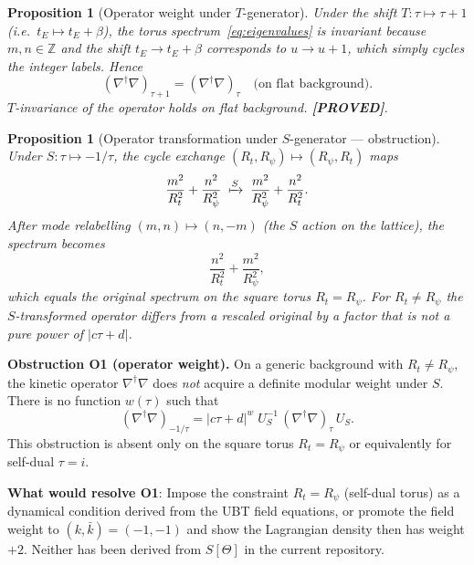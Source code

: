 \documentclass[12pt,a4paper]{article}
\newtheorem{proposition}[theorem]{Proposition}
\theoremstyle{definition}
\theoremstyle{remark}
\newcommand{\PROVED}{\textcolor{green!50!black}{\textbf{[PROVED]}}}
\newcommand{\ZZ}{\mathbb{Z}}
\begin{document}
\begin{proposition}[Operator weight under $T$-generator]
\label{prop:T-covariance}
Under the shift $T:\tau\mapsto\tau+1$ (i.e.\ $t_E\mapsto t_E+\beta$), the
torus spectrum~\eqref{eq:eigenvalues} is invariant because $m,n\in\ZZ$ and
the shift $t_E\to t_E+\beta$ corresponds to $u\to u+1$, which simply cycles
the integer labels. Hence
\begin{equation}
  (\nabla^\dagger\nabla)_{\tau+1} = (\nabla^\dagger\nabla)_\tau
  \quad\text{(on flat background).}
\end{equation}
$T$-invariance of the operator holds on flat background. \PROVED.
\end{proposition}

\begin{proposition}[Operator transformation under $S$-generator — obstruction]
\label{prop:S-obstruction}
Under $S:\tau\mapsto-1/\tau$, the cycle exchange
$(R_t,R_\psi)\mapsto(R_\psi,R_t)$ maps
\begin{equation}
  \frac{m^2}{R_t^2}+\frac{n^2}{R_\psi^2}
  \;\xmapsto{S}\;
  \frac{m^2}{R_\psi^2}+\frac{n^2}{R_t^2}.
  \label{eq:S-spectrum}
\end{equation}
After mode relabelling $(m,n)\mapsto(n,-m)$ (the $S$ action on the lattice),
the spectrum becomes
\begin{equation}
  \frac{n^2}{R_t^2}+\frac{m^2}{R_\psi^2},
\end{equation}
which equals the original spectrum on the \emph{square} torus $R_t=R_\psi$.
For $R_t\ne R_\psi$ the $S$-transformed operator differs from a rescaled
original by a factor that is \emph{not} a pure power of $|c\tau+d|$.
\end{proposition}

\begin{gapbox}
\textbf{Obstruction O1 (operator weight).}
On a generic background with $R_t\ne R_\psi$, the kinetic operator
$\nabla^\dagger\nabla$ does \emph{not} acquire a definite modular weight
under $S$.  There is no function $w(\tau)$ such that
\begin{equation}
  (\nabla^\dagger\nabla)_{-1/\tau}
  = |c\tau+d|^w\;U_S^{-1}\,(\nabla^\dagger\nabla)_\tau\,U_S.
\end{equation}
This obstruction is absent only on the square torus $R_t=R_\psi$ or
equivalently for self-dual $\tau=i$.

\medskip
\noindent\textbf{What would resolve O1}: Impose the constraint $R_t=R_\psi$
(self-dual torus) as a dynamical condition derived from the UBT field equations,
or promote the field weight to $(k,\bar k)=(-1,-1)$ and show the Lagrangian
density then has weight $+2$.  Neither has been derived from $S[\Theta]$
in the current repository.
\end{gapbox}
\end{document}
